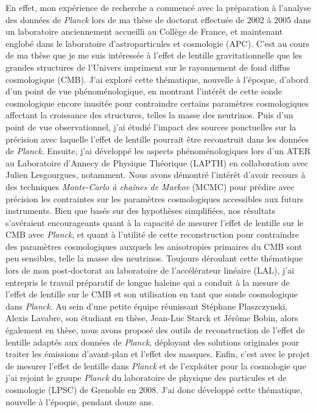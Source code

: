 \documentclass[a4paper, 11pt]{report}
\begin{document}
En effet, mon expérience de recherche a commencé avec la préparation
à l'analyse des données de \emph{Planck} lors de ma thèse de doctorat
effectuée de 2002 à 2005 dans un laboratoire anciennement accueilli au
Collège de France, et maintenant englobé dans le laboratoire
d'astroparticules et cosmologie (APC). C'est au cours de ma thèse que
je me suis intéressée à l'effet de lentille gravitationnelle que les
grandes structures de l'Univers impriment sur le rayonnement de fond
diffus cosmologique (CMB). J'ai exploré cette thématique, nouvelle à
l'époque, d'abord d'un point de vue phénoménologique, en montrant
l'intérêt de cette sonde cosmologique encore inusitée pour contraindre
certains paramètres cosmologiques affectant la croissance des
structures, telles la masse des neutrinos. Puis d'un point de vue
observationnel, j'ai étudié l'impact des sources ponctuelles sur la
précision avec laquelle l'effet de lentille pourrait être reconstruit
dans les données de \emph{Planck}. Ensuite, j'ai développé les aspects
phénoménologiques lors d'un ATER au Laboratoire d'Annecy de Physique
Théorique (LAPTH) en collaboration avec Julien Lesgourgues,
notamment. Nous avons démontré l'intérêt d'avoir recours à des
techniques \emph{Monte-Carlo à chaînes de Markov} (MCMC) pour prédire
avec précision les contraintes sur les paramètres cosmologiques
accessibles aux futurs instruments. Bien que basés sur des hypothèses
simplifiées, nos résultats s'avéraient encourageants quant à la
capacité de mesurer l'effet de lentille sur le CMB avec \emph{Planck}, et
quant à l'utilité de cette reconstruction pour contraindre des
paramètres cosmologiques auxquels les anisotropies primaires du CMB
sont peu sensibles, telle la masse des neutrinos. Toujours déroulant
cette thématique lors de mon post-doctorat au laboratoire de
l'accélérateur linéaire (LAL), j'ai entrepris le travail préparatif de
longue haleine qui a conduit à la mesure de l'effet de lentille sur le
CMB et son utilisation en tant que sonde cosmologique dans \emph{Planck}. Au
sein d'une petite équipe réunissant Stéphane Plaszczynski, Alexis
Lavabre, son étudiant en thèse, Jean-Luc Starck et Jérôme Bobin, alors
également en thèse, nous avons proposé des outils de reconstruction de
l'effet de lentille adaptés aux données de \emph{Planck}, déployant des
solutions originales pour traiter les émissions d'avant-plan et
l'effet des masques. Enfin, c'est avec le projet de mesurer l'effet de
lentille dans \emph{Planck} et de l'exploiter pour la cosmologie que j'ai
rejoint le groupe \emph{Planck} du laboratoire de physique des particules et
de cosmologie (LPSC) de Grenoble en 2008. J'ai donc développé cette
thématique, nouvelle à l'époque, pendant douze ans.
\end{document}
